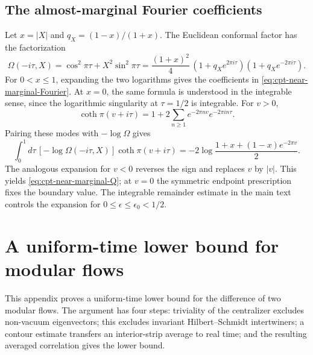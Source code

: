 \documentclass[a4paper,11pt]{article}
\theoremstyle{definition}
\begin{document}
\subsection{The almost-marginal Fourier coefficients}

Let $x=|X|$ and $q_X=(1-x)/(1+x)$. The Euclidean conformal factor has the factorization
\begin{equation}
 \Omega(-i\tau,X)=\cos^2\pi\tau+X^2\sin^2\pi\tau
 =\frac{(1+x)^2}4\,(1+q_Xe^{2\pi i\tau})(1+q_Xe^{-2\pi i\tau}).
 \label{eq:appB-factorization}
\end{equation}
For $0<x\le1$, expanding the two logarithms gives the coefficients in \eqref{eq:cpt-near-marginal-Fourier}. At $x=0$, the same formula is understood in the integrable sense, since the logarithmic singularity at $\tau=1/2$ is integrable. For $v>0$,
\begin{equation}
 \coth\pi(v+i\tau)=1+2\sum_{n\ge1}e^{-2\pi nv}e^{-2\pi in\tau}.
 \label{eq:appB-coth}
\end{equation}
Pairing these modes with $-\log\Omega$ gives
\begin{equation}
 \int_0^1d\tau\,[-\log\Omega(-i\tau,X)]\coth\pi(v+i\tau)
 =-2\log\frac{1+x+(1-x)e^{-2\pi v}}2 .
 \label{eq:appB-paired}
\end{equation}
The analogous expansion for $v<0$ reverses the sign and replaces $v$ by $|v|$. This yields \eqref{eq:cpt-near-marginal-Q}; at $v=0$ the symmetric endpoint prescription fixes the boundary value. The integrable remainder estimate in the main text controls the expansion for $0\le\epsilon\le\epsilon_0<1/2$.

\section{A uniform-time lower bound for modular flows}
\label{app:uniform-lower-bound}

This appendix proves a uniform-time lower bound for the difference of two modular flows. The argument has four steps: triviality of the centralizer excludes non-vacuum eigenvectors; this excludes invariant Hilbert--Schmidt intertwiners; a contour estimate transfers an interior-strip average to real time; and the resulting averaged correlation gives the lower bound.
\end{document}
